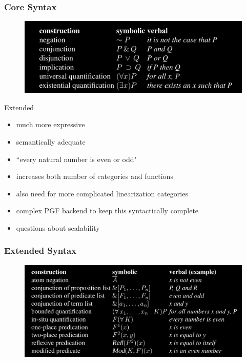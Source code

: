 \documentclass[10pt]{beamer}
\begin{document}
\begin{frame}
\frametitle{Core Syntax}

\begin{figure}
\hspace*{-3mm}%
   \includegraphics[width= \paperwidth]{core.png}
\end{figure}

\end{frame}

\begin{frame}

\begin{block}{Extended}
\begin{itemize}
\item much more expressive
\item semantically adequate
\item ``every natural number is even or odd"
\item increases both number of categories and functions
\item also need for more complicated linearization categories
\item complex PGF backend to keep this syntactically complete
\item questions about scalability
\end{itemize}

\end{block}

\end{frame}

\begin{frame}
\frametitle{Extended Syntax}

\begin{figure}
\hspace*{-3mm}%
   \includegraphics[width= \paperwidth]{e.png}
\end{figure}
\end{frame}
\end{document}
